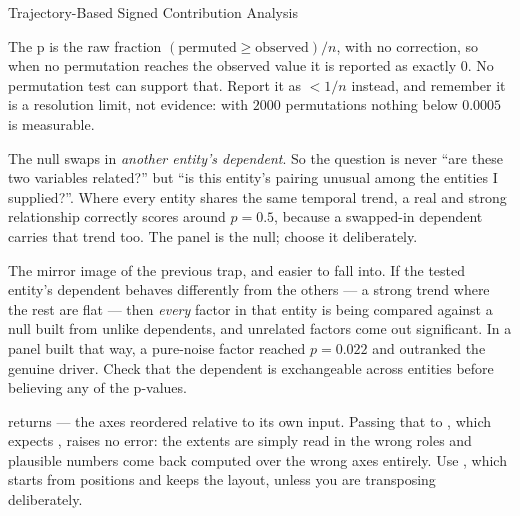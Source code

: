 \begin{recipe}[label=rec:trajectory-contributions]{Trajectory-Based Signed Contribution Analysis}
\begin{pitfall}
  The p is the raw fraction $(\text{permuted} \geq \text{observed})/n$, with no
  correction, so when no permutation reaches the observed value it is reported
  as exactly $0$. No permutation test can support that. Report it as
  $< 1/n$ instead, and remember it is a resolution limit, not evidence: with
  $2000$ permutations nothing below $0.0005$ is measurable.
\end{pitfall}

\begin{pitfall}
  The null swaps in \emph{another entity's dependent}. So the question is
  never ``are these two variables related?'' but ``is this entity's pairing
  unusual among the entities I supplied?''. Where every entity shares the same
  temporal trend, a real and strong relationship correctly scores around
  $p = 0.5$, because a swapped-in dependent carries that trend too. The panel
  is the null; choose it deliberately.
\end{pitfall}

\begin{pitfall}
  The mirror image of the previous trap, and easier to fall into. If the tested
  entity's dependent behaves differently from the others --- a strong trend
  where the rest are flat --- then \emph{every} factor in that entity is being
  compared against a null built from unlike dependents, and unrelated factors
  come out significant. In a panel built that way, a pure-noise factor reached
  $p = 0.022$ and outranked the genuine driver. Check that the dependent is
  exchangeable across entities before believing any of the p-values.
\end{pitfall}

\begin{pitfall}
   returns
   --- the axes reordered
  relative to its own input. Passing that to
  , which expects
  , raises no error: the extents
  are simply read in the wrong roles and plausible numbers come back computed
  over the wrong axes entirely. Use
  , which starts from
  positions and keeps the layout, unless you are transposing deliberately.
\end{pitfall}


\end{recipe}
